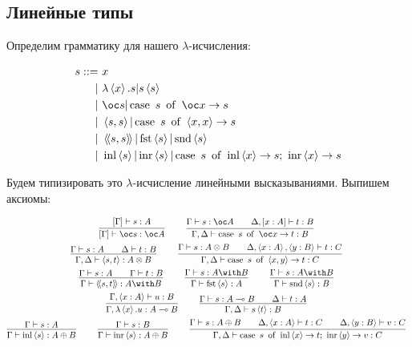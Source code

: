 \subsection{\texorpdfstring{Линейные типы}{Linear types}}
Определим грамматику для нашего $\lambda$-исчисления:
\begin{bnf}
\begin{alignat*}{2}
	s ::= &\ x \\
			  | &\ \lambda\pair{x}.s | s\pair{s} \\
			  | &\ \oc s | \caseb{s}{\oc x \rightarrow s} \\
			  | &\ \pair{s,s} | \caseb{s}{\pair{x,x} \rightarrow s} \\
			  | &\ \ppair{s,s} | \fst \pair{s} | \snd \pair{s} \\
			  | &\ \inl \pair{s} | \inr \pair{s}|
                    \casec{s}{\inl \pair{x} \rightarrow s}{\inr \pair{x} \rightarrow s}
\end{alignat*}
\end{bnf}
Будем типизировать это $\lambda$-исчисление линейными высказываниями. Выпишем аксиомы:
\begin{@empty}
\inferspacing
\begin{gather*}
	\infer[]
		{[\Gamma]\vdash \oc s : \oc A}
		{[\Gamma]\vdash s : A} \qquad
	\infer[]
		{\Gamma, \Delta\vdash \caseb{s}{\oc x \rightarrow t} : B}
		{\Gamma\vdash s : \oc A && \Delta, [x : A]\vdash t : B} \\
	\infer[]
		{\Gamma, \Delta\vdash \pair{s, t} : A \otimes B}
		{\Gamma \vdash s : A && \Delta\vdash t : B} \qquad
	\infer[]
		{\Gamma, \Delta \vdash \caseb{s}{\pair{x, y} \rightarrow t} : C}
		{\Gamma\vdash s : A \otimes B && \Delta, \pair{x : A}, \pair{y : B} \vdash t : C} \\
	\infer[]{\Gamma \vdash \ppair{s, t} : A \with B}{\Gamma \vdash s : A && \Gamma \vdash t : B} \qquad
	\infer[]{\Gamma \vdash \fst \pair{s} : A}{\Gamma \vdash s : A \with B} \qquad
	\infer[]{\Gamma \vdash \snd \pair{s} : B}{\Gamma \vdash s : A \with B} \\
	\infer[]{\Gamma, \lambda\pair{x}.u : A \multimap B}{\Gamma, \pair{x : A} \vdash u : B} \qquad
	\infer[]{\Gamma, \Delta \vdash  s \pair{t} : B}{\Gamma \vdash s : A \multimap B && \Delta \vdash t : A} \\
	\infer[]{\Gamma \vdash \inl \pair{s} : A \oplus B}{\Gamma \vdash s : A} \qquad
	\infer[]{\Gamma \vdash \inr \pair{s} : A \oplus B}{\Gamma \vdash s : B} \qquad
	\infer[]
		{\Gamma, \Delta \vdash \casec{s}{\inl \pair{x} \rightarrow t}{\inr \pair{y} \rightarrow v} : C}
		{\Gamma \vdash s : A \oplus B && \Delta, \pair{x : A} \vdash t : C && \Delta, \pair{y : B} \vdash v : C}
\end{gather*}
\end{@empty}
